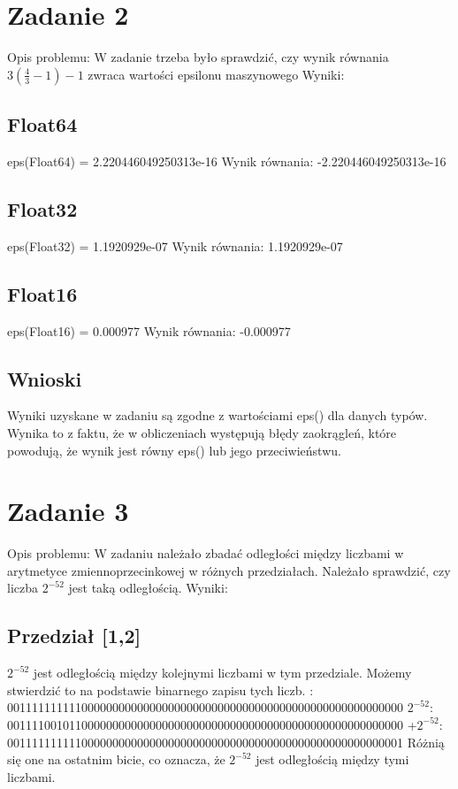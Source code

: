 \documentclass{article}
\begin{document}
\section{Zadanie 2}
Opis problemu:
W zadanie trzeba było sprawdzić, czy wynik równania \newline $3(\frac{4}{3}-1)-1$ zwraca wartości epsilonu maszynowego\newline\newline
Wyniki:
\subsection{Float64}
eps(Float64) = 2.220446049250313e-16 \newline
Wynik równania: -2.220446049250313e-16 
\subsection{Float32}
eps(Float32) = 1.1920929e-07 \newline
Wynik równania: 1.1920929e-07
\subsection{Float16}
eps(Float16) = 0.000977 \newline
Wynik równania: -0.000977
\subsection{Wnioski}
Wyniki uzyskane w zadaniu są zgodne z wartościami eps() dla danych typów. Wynika to z faktu, że w obliczeniach występują błędy zaokrągleń, które powodują, że wynik jest równy eps() lub jego przeciwieństwu.
\section{Zadanie 3}
Opis problemu:
W zadaniu należało zbadać odległości między liczbami w arytmetyce zmiennoprzecinkowej w różnych przedziałach. Należało sprawdzić, czy liczba $2^{-52}$ jest taką odległością.\newline\newline
Wyniki:
\subsection{Przedział [1,2]}
$2^{-52}$ jest odległością między kolejnymi liczbami w tym przedziale. Możemy stwierdzić to na podstawie binarnego zapisu tych liczb. : 0011111111110000000000000000000000000000000000000000000000000000 \newline
$2^{-52}$: 0011110010110000000000000000000000000000000000000000000000000000 +$2^{-52}$: 0011111111110000000000000000000000000000000000000000000000000001 \newline
Różnią się one na ostatnim bicie, co oznacza, że $2^{-52}$ jest odległością między tymi liczbami.
\end{document}
